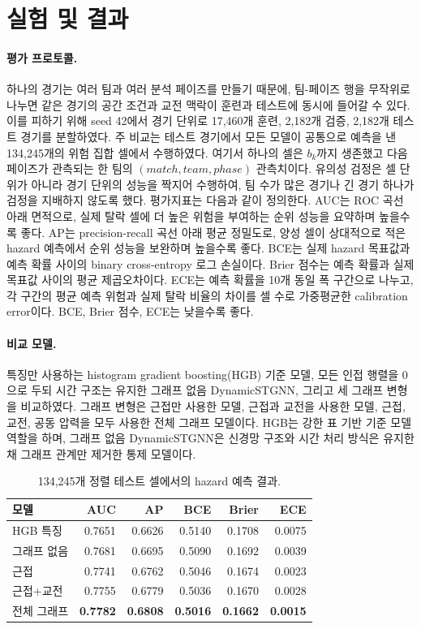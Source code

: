 \section{실험 및 결과}
\label{sec:results}

\paragraph{평가 프로토콜.}
하나의 경기는 여러 팀과 여러 분석 페이즈를 만들기 때문에, 팀-페이즈
행을 무작위로 나누면 같은 경기의 공간 조건과 교전 맥락이 훈련과 테스트에
동시에 들어갈 수 있다. 이를 피하기 위해 seed 42에서 경기 단위로
17,460개 훈련, 2,182개 검증, 2,182개 테스트 경기를 분할하였다.
주 비교는 테스트 경기에서 모든 모델이 공통으로 예측을 낸 134,245개의
위험 집합 셀에서 수행하였다. 여기서 하나의 셀은 \(b_k\)까지 생존했고
다음 페이즈가 관측되는 한 팀의 \((match, team, phase)\) 관측치이다.
유의성 검정은 셀 단위가 아니라 경기 단위의 성능을 짝지어 수행하여,
팀 수가 많은 경기나 긴 경기 하나가 검정을 지배하지 않도록 했다.
평가지표는 다음과 같이 정의한다. AUC는 ROC 곡선 아래 면적으로, 실제
탈락 셀에 더 높은 위험을 부여하는 순위 성능을 요약하며 높을수록 좋다.
AP는 precision-recall 곡선 아래 평균 정밀도로, 양성 셀이 상대적으로 적은
hazard 예측에서 순위 성능을 보완하며 높을수록 좋다. BCE는 실제
hazard 목표값과 예측 확률 사이의 binary cross-entropy 로그 손실이다.
Brier 점수는 예측 확률과 실제 목표값 사이의 평균 제곱오차이다. ECE는
예측 확률을 10개 동일 폭 구간으로 나누고, 각 구간의 평균 예측 위험과
실제 탈락 비율의 차이를 셀 수로 가중평균한 calibration error이다. BCE,
Brier 점수, ECE는 낮을수록 좋다.

\paragraph{비교 모델.}
특징만 사용하는 histogram gradient boosting(HGB) 기준 모델, 모든
인접 행렬을 0으로 두되 시간 구조는 유지한 그래프 없음
DynamicSTGNN, 그리고 세 그래프 변형을 비교하였다. 그래프 변형은
근접만 사용한 모델, 근접과 교전을 사용한 모델, 근접, 교전, 공동
압력을 모두 사용한 전체 그래프 모델이다. HGB는 강한 표 기반 기준 모델
역할을 하며, 그래프 없음 DynamicSTGNN은 신경망 구조와 시간 처리 방식은
유지한 채 그래프 관계만 제거한 통제 모델이다.

\begin{table}[htbp]
\centering
\caption{134,245개 정렬 테스트 셀에서의 hazard 예측 결과.}
\label{tab:main}
\scriptsize
\setlength{\tabcolsep}{3pt}
\begin{tabular}{lrrrrr}
\toprule
모델 & AUC & AP & BCE & Brier & ECE \\
\midrule
HGB 특징 & 0.7651 & 0.6626 & 0.5140 & 0.1708 & 0.0075 \\
그래프 없음 & 0.7681 & 0.6695 & 0.5090 & 0.1692 & 0.0039 \\
근접 & 0.7741 & 0.6762 & 0.5046 & 0.1674 & 0.0023 \\
근접+교전 & 0.7755 & 0.6779 & 0.5036 & 0.1670 & 0.0028 \\
전체 그래프 & \textbf{0.7782} & \textbf{0.6808} & \textbf{0.5016} & \textbf{0.1662} & \textbf{0.0015} \\
\bottomrule
\end{tabular}
\end{table}

